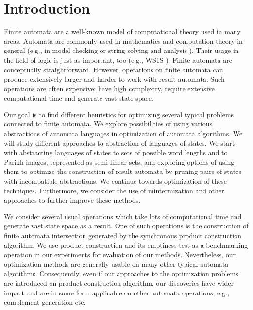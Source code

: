 \chapter{Introduction}


Finite automata are a well-known model of computational theory used in many areas. Automata are commonly used in mathematics and computation theory in general (e.g., in model checking \cite{DBLP:conf/cav/SiegelY20} or string solving and analysis \cite{DBLP:conf/popl/LinB16}). Their usage in the field of logic is just as important, too (e.g., WS1S \cite{DBLP:conf/tacas/FiedorHJLV17, DBLP:journals/acta/FiedorHLV19}). Finite automata are conceptually straightforward. However, operations on finite automata can produce extensively larger and harder to work with result automata. Such operations are often expensive: have high complexity, require extensive computational time and generate vast state space.

Our goal is to find different heuristics for optimizing several typical problems connected to finite automata. We explore possibilities of using various abstractions of automata languages in optimization of automata algorithms. We will study different approaches to abstraction of languages of states. We start with abstracting languages of states to sets of possible word lengths and to Parikh images, represented as semi-linear sets, and exploring options of using them to optimize the construction of result automata by pruning pairs of states with incompatible abstractions. We continue towards optimization of these techniques. Furthermore, we consider the use of mintermization and other approaches to further improve these methods.

We consider several usual operations which take lots of computational time and generate vast state space as a result. One of such operations is the construction of finite automata intersection generated by the synchronous product construction algorithm. We use product construction and its emptiness test as a benchmarking operation in our experiments for evaluation of our methods. Nevertheless, our optimization methods are generally usable on many other typical automata algorithms. Consequently, even if our approaches to the optimization problems are introduced on product construction algorithm, our discoveries have wider impact and are in some form applicable on other automata operations, e.g., complement generation etc.

